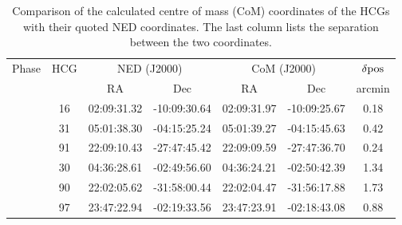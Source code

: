 \begin{table*}
\centering
\caption{Comparison of the calculated centre of mass (CoM) coordinates of the HCGs with their quoted NED coordinates. The last column lists the separation between the two coordinates.}\label{tab:com_coords}
\begin{tabular}{c c c c c c c} 
\hline 
\hline 
\multirow{2}{*}{Phase} & \multirow{2}{*}{HCG} & \multicolumn{2}{c}{NED (J2000)} & \multicolumn{2}{c}{CoM (J2000)} & $\delta\rm pos$ \\ 
 & & RA & Dec & RA & Dec & arcmin \\ 
\hline \rule{0pt}{10pt} 
\multirow{3}{*}{2} & 16 & 02:09:31.32 & -10:09:30.64 & 02:09:31.97 & -10:09:25.67 & 0.18\\ 
 & 31 & 05:01:38.30 & -04:15:25.24 & 05:01:39.27 & -04:15:45.63 & 0.42\\ 
 & 91 & 22:09:10.43 & -27:47:45.42 & 22:09:09.59 & -27:47:36.70 & 0.24\\ 
\hline \rule{0pt}{10pt} 
\multirow{3}{*}{3} & 30 & 04:36:28.61 & -02:49:56.60 & 04:36:24.21 & -02:50:42.39 & 1.34\\ 
 & 90 & 22:02:05.62 & -31:58:00.44 & 22:02:04.47 & -31:56:17.88 & 1.73\\ 
 & 97 & 23:47:22.94 & -02:19:33.56 & 23:47:23.91 & -02:18:43.08 & 0.88\\ 
\hline
\end{tabular}
\end{table*}